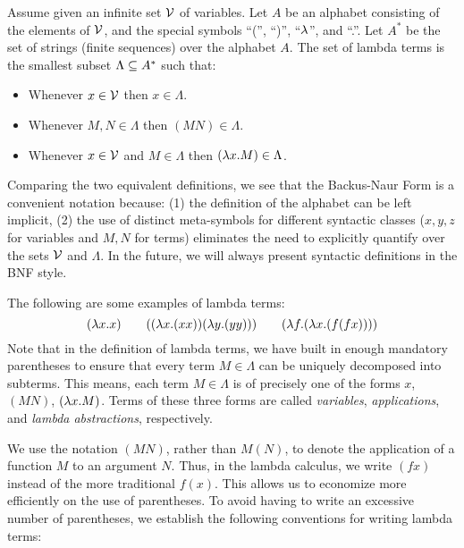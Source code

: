 \documentclass{article}
\begin{document}
\begin{definition}
  Assume given an infinite set ${\cal V}$ of variables. Let $A$ be an
  alphabet consisting of the elements of ${\cal V}$, and the special
  symbols ``('', ``)'', ``$\lambda$'', and ``.''. Let $A^*$ be the set of
  strings (finite sequences) over the alphabet $A$.  The set of lambda
  terms is the smallest subset $\Lambda\subseteq A^*$ such that:
  \begin{itemize}
  \item Whenever $x\in{\cal V}$ then $x\in\Lambda$.
  \item Whenever $M,N\in\Lambda$ then $(MN)\in\Lambda$.
  \item Whenever $x\in{\cal V}$ and $M\in\Lambda$ then $(\lambda x.M)\in\Lambda$.
  \end{itemize}
\end{definition}

Comparing the two equivalent definitions, we see that the Backus-Naur
Form is a convenient notation because: (1) the definition of the
alphabet can be left implicit, (2) the use of distinct meta-symbols
for different syntactic classes ($x,y,z$ for variables and $M,N$ for
terms) eliminates the need to explicitly quantify over the sets
${\cal V}$ and $\Lambda$. In the future, we will always present syntactic
definitions in the BNF style.

The following are some examples of lambda terms:
\[ (\lambda x.x) \hspace{2em} ((\lambda x.(xx))(\lambda y.(yy))) \hspace{2em} (\lambda f.(\lambda x.(f(fx))))
\]
Note that in the definition of lambda terms, we have built in enough
mandatory parentheses to ensure that every term $M\in\Lambda$ can be
uniquely decomposed into subterms. This means, each term $M\in\Lambda$
is of precisely one of the forms $x$, $(MN)$, $(\lambda x.M)$. Terms of
these three forms are called {\em variables}, {\em applications}, and
{\em lambda abstractions}, respectively. 

We use the notation $(MN)$, rather than $M(N)$, to denote the
application of a function $M$ to an argument $N$. Thus, in the lambda
calculus, we write $(fx)$ instead of the more traditional $f(x)$. This
allows us to economize more efficiently on the use of parentheses. To
avoid having to write an excessive number of parentheses, we establish
the following conventions for writing lambda terms:
\end{document}
